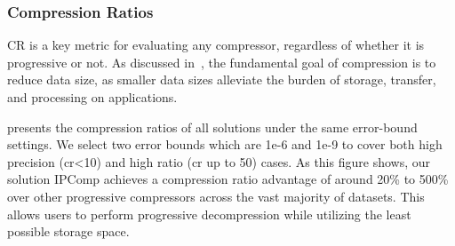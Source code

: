 \subsubsection{Compression Ratios}

CR is a key metric for evaluating any compressor, regardless of whether it is progressive or not. As discussed in~, the fundamental goal of compression is to reduce data size, as smaller data sizes alleviate the burden of storage, transfer, and processing on applications. 



 presents the compression ratios of all solutions under the same error-bound settings. We select two error bounds which are 1e-6 and 1e-9  to cover both high precision (cr<10) and high ratio (cr up to 50) cases.
As this figure shows, our solution IPComp achieves a compression ratio advantage of around 20\% to 500\% over other progressive compressors across the vast majority of datasets. This allows users to perform progressive decompression while utilizing the least possible storage space.


